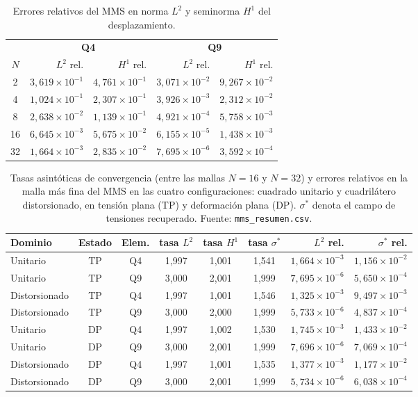 \begin{table}[htbp]
\centering
\caption{Errores relativos del MMS en norma $L^2$ y seminorma $H^1$ del desplazamiento.}
\label{tab:mms-rel}
\begin{tabular}{c r r r r}
\hline
 & \multicolumn{2}{c}{\textbf{Q4}} & \multicolumn{2}{c}{\textbf{Q9}} \\
$N$ & $L^2$ rel. & $H^1$ rel. & $L^2$ rel. & $H^1$ rel. \\
\hline
2  & $3{,}619\times10^{-1}$ & $4{,}761\times10^{-1}$ & $3{,}071\times10^{-2}$ & $9{,}267\times10^{-2}$ \\
4  & $1{,}024\times10^{-1}$ & $2{,}307\times10^{-1}$ & $3{,}926\times10^{-3}$ & $2{,}312\times10^{-2}$ \\
8  & $2{,}638\times10^{-2}$ & $1{,}139\times10^{-1}$ & $4{,}921\times10^{-4}$ & $5{,}758\times10^{-3}$ \\
16 & $6{,}645\times10^{-3}$ & $5{,}675\times10^{-2}$ & $6{,}155\times10^{-5}$ & $1{,}438\times10^{-3}$ \\
32 & $1{,}664\times10^{-3}$ & $2{,}835\times10^{-2}$ & $7{,}695\times10^{-6}$ & $3{,}592\times10^{-4}$ \\
\hline
\end{tabular}
\end{table}

\begin{table}[htbp]
\centering
\caption[Tasas asintóticas del MMS en las cuatro configuraciones.]{Tasas asintóticas de convergencia (entre las mallas $N=16$ y $N=32$) y errores relativos en la malla más fina del MMS en las cuatro configuraciones: cuadrado unitario y cuadrilátero distorsionado, en tensión plana (TP) y deformación plana (DP). $\sigma^*$ denota el campo de tensiones recuperado. Fuente: \texttt{mms\_resumen.csv}.}
\label{tab:mms-configs}
\small
\setlength{\tabcolsep}{4pt}
\begin{tabular}{l c c c c c r r}
\hline
Dominio & Estado & Elem. & tasa $L^2$ & tasa $H^1$ & tasa $\sigma^*$ & $L^2$ rel. & $\sigma^*$ rel. \\
\hline
Unitario      & TP & Q4 & 1,997 & 1,001 & 1,541 & $1{,}664\times10^{-3}$ & $1{,}156\times10^{-2}$ \\
Unitario      & TP & Q9 & 3,000 & 2,001 & 1,999 & $7{,}695\times10^{-6}$ & $5{,}650\times10^{-4}$ \\
Distorsionado & TP & Q4 & 1,997 & 1,001 & 1,546 & $1{,}325\times10^{-3}$ & $9{,}497\times10^{-3}$ \\
Distorsionado & TP & Q9 & 3,000 & 2,000 & 1,999 & $5{,}733\times10^{-6}$ & $4{,}837\times10^{-4}$ \\
Unitario      & DP & Q4 & 1,997 & 1,002 & 1,530 & $1{,}745\times10^{-3}$ & $1{,}433\times10^{-2}$ \\
Unitario      & DP & Q9 & 3,000 & 2,001 & 1,999 & $7{,}696\times10^{-6}$ & $7{,}069\times10^{-4}$ \\
Distorsionado & DP & Q4 & 1,997 & 1,001 & 1,535 & $1{,}377\times10^{-3}$ & $1{,}177\times10^{-2}$ \\
Distorsionado & DP & Q9 & 3,000 & 2,001 & 1,999 & $5{,}734\times10^{-6}$ & $6{,}038\times10^{-4}$ \\
\hline
\end{tabular}
\end{table}

